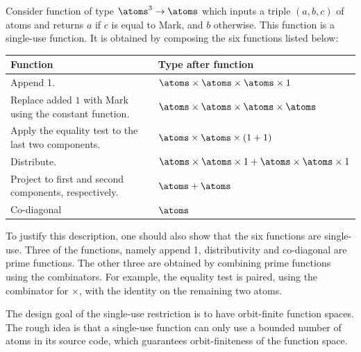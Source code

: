 \begin{example}\label{ex:six-compositions}
    Consider function of type $\atoms^3 \to \atoms$ which inputs a triple $(a,b,c)$ of atoms and returns $a$ if $c$ is equal to Mark, and $b$ otherwise. This function is a single-use function. It is obtained by composing the six functions listed below:
\begin{center}
    \begin{tabular}{ll}
        Function & Type after function \\
        \hline
        Append 1. & $ \atoms \times \atoms \times \atoms \times 1$ \\
        Replace added $1$ with Mark using the constant function. & $\atoms \times \atoms \times \atoms \times \atoms$ \\
        Apply the equality test to the last two components. & $ \atoms \times \atoms \times (1+1)$ \\
        Distribute. & $ \atoms \times \atoms \times 1 +   \atoms \times \atoms \times 1$ \\
        Project to first and second components, respectively. & $\atoms + \atoms$ \\
        Co-diagonal & $\atoms$ 
    \end{tabular}
\end{center}
To justify this description, one should also show that the six functions are single-use. Three of the functions, namely append 1, distributivity and co-diagonal are prime functions. The other three are obtained by combining prime functions using the combinators. For example, the equality test is paired, using the combinator for $\times$, with the identity on the remaining two atoms. \exampleend
\end{example}

The design goal of the single-use restriction is to have orbit-finite function spaces. The rough idea is that a single-use function can only use a bounded number of atoms in its source code, which guarantees orbit-finiteness of the function space. 

